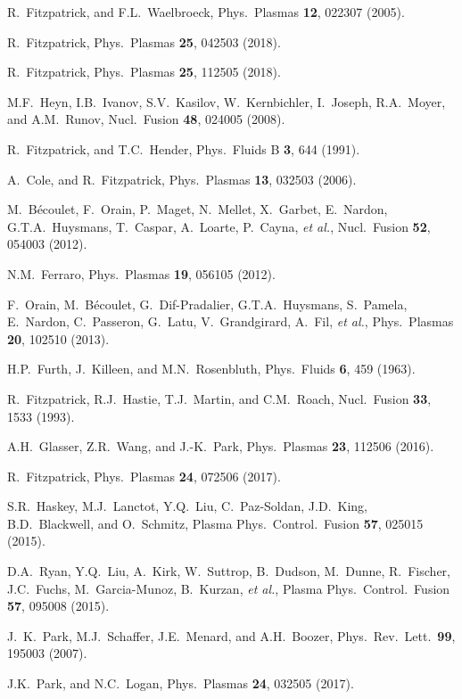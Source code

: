 \documentclass[12pt,prb,aps]{revtex4-1}
\begin{document}
\begin{thebibliography}{99}
 R.~Fitzpatrick, and F.L.~Waelbroeck, Phys.\ Plasmas {\bf 12}, 022307 (2005).

 R.~Fitzpatrick, Phys.\ Plasmas {\bf 25}, 042503 (2018).

 R.~Fitzpatrick, Phys.\ Plasmas {\bf 25}, 112505 (2018).

 M.F.~Heyn, I.B.~Ivanov, S.V.~Kasilov, W.~Kernbichler, I.~Joseph, R.A.~Moyer,  and A.M.~Runov, Nucl.\ Fusion {\bf 48}, 024005 (2008). 

 R.~Fitzpatrick, and T.C.~Hender, Phys.\ Fluids B {\bf 3}, 644 (1991).

 A.~Cole, and R.~Fitzpatrick, Phys.\ Plasmas {\bf 13}, 032503 (2006).

 M.~B\'{e}coulet, F.~Orain, P.~Maget, N.~Mellet, X.~Garbet, E.~Nardon, G.T.A.~Huysmans, T.~Caspar, A.~Loarte,  P.~Cayna, {\em et al.}, 
Nucl.\ Fusion {\bf 52}, 054003  (2012).

 N.M.~Ferraro, Phys.\ Plasmas {\bf 19}, 056105  (2012).

 F.~Orain, M.~B\'{e}coulet, G.~Dif-Pradalier, G.T.A.~Huysmans, S.~Pamela,   E.~Nardon, C.~Passeron, G.~Latu, V.~Grandgirard, A.~Fil, {\em et al.}, 
Phys.\ Plasmas {\bf 20}, 102510 (2013). 

 H.P.~Furth,  J.~Killeen, and M.N.~Rosenbluth,  Phys.\ Fluids {\bf 6}, 459 (1963).

 R.~Fitzpatrick, R.J.~Hastie, T.J.~Martin, and C.M.~Roach, Nucl.\ Fusion {\bf 33}, 1533 (1993).

 A.H.~Glasser, Z.R.~Wang, and J.-K.~Park, Phys.\ Plasmas {\bf 23}, 112506 (2016).

 R.~Fitzpatrick, Phys.\ Plasmas {\bf 24}, 072506 (2017). 

 S.R.~Haskey, M.J.~Lanctot, Y.Q.~Liu, C.~Paz-Soldan, J.D.~King, B.D.~Blackwell, and O.~Schmitz,  Plasma 
Phys.\ Control.\ Fusion {\bf 57}, 025015 (2015).

 D.A.~Ryan,  Y.Q.~Liu, A.~Kirk, W.~Suttrop, B.~Dudson, M.~Dunne, R.~Fischer, J.C.~Fuchs, M.~Garcia-Munoz, B.~Kurzan, {\it et al.}, 
Plasma Phys.\ Control.\ Fusion {\bf 57}, 095008 (2015).

 J.~K.~Park, M.J.~Schaffer, J.E.~Menard, and A.H.~Boozer, Phys.\ Rev.\ Lett.\ {\bf 99}, 195003 (2007).

 J.K.~Park, and N.C.~Logan, Phys.\ Plasmas {\bf 24}, 032505 (2017).


\end{thebibliography}
\end{document}
